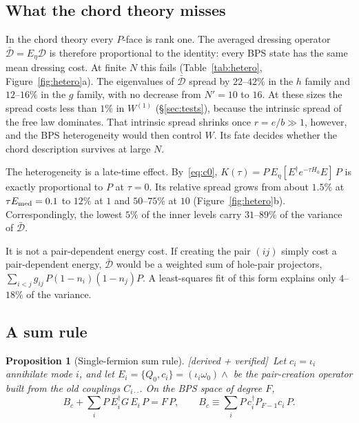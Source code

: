 \documentclass[11pt]{article}
\newcommand{\Np}{N'}
\newcommand{\Dc}{\mathcal D}
\newcommand{\Dbar}{\bar{\mathcal D}}
\newcommand{\Wone}{W^{(1)}}
\newcommand{\tagbox}[2]{\textsf{\small\color{#1}[#2]}}
\newcommand{\VER}{\tagbox{cder}{derived + verified}}
\theoremstyle{plain}
\newtheorem{proposition}{Proposition}
\theoremstyle{remark}
\numberwithin{equation}{section}
\begin{document}
\subsection{What the chord theory misses}

In the chord theory every $P$-face is rank one. The averaged dressing operator $\Dbar=E_\eta\Dc$ is therefore
proportional to the identity: every BPS state has the same mean dressing cost. At finite $N$ this fails
(Table~\ref{tab:hetero}, Figure~\ref{fig:hetero}a). The eigenvalues of $\Dbar$ spread by $22$--$42\%$ in the $h$ family
and $12$--$16\%$ in the $g$ family, with no decrease from $\Np=10$ to $16$. At these sizes the spread costs less than
$1\%$ in $\Wone$ (\S\ref{sec:tests}), because the intrinsic spread of the free law dominates. That intrinsic spread
shrinks once $r=e/b\gg1$, however, and the BPS heterogeneity would then control $W$. Its fate decides whether the chord
description survives at large $N$.

The heterogeneity is a late-time effect. By~\eqref{eq:c0}, $K(\tau)=P\,E_\eta[E^\dagger e^{-\tau H_0}E]\,P$ is exactly
proportional to $P$ at $\tau=0$. Its relative spread grows from about $1.5\%$ at $\tau E_{\rm med}=0.1$ to $12\%$ at $1$
and $50$--$75\%$ at $10$ (Figure~\ref{fig:hetero}b). Correspondingly, the lowest $5\%$ of the inner levels carry
$31$--$89\%$ of the variance of $\Dbar$.

It is not a pair-dependent energy cost. If creating the pair $(ij)$ simply cost a pair-dependent energy, $\Dbar$ would
be a weighted sum of hole-pair projectors, $\sum_{i<j}g_{ij}\,P(1-n_i)(1-n_j)P$. A least-squares fit of this form
explains only $4$--$18\%$ of the variance.

\subsection{A sum rule}

\begin{proposition}[Single-fermion sum rule]\label{prop:sumrule}\VER\
Let $c_i=\iota_i$ annihilate mode $i$, and let $E_i=\{Q_0,c_i\}=(\iota_i\omega_0)\wedge$ be the pair-creation
operator built from the old couplings $C_{i\cdot\cdot}$. On the BPS space of degree $F$,
\begin{equation}\label{eq:sumrule}
B_c+\sum_iP\,E_i^\dagger G\,E_i\,P=F\,P,\qquad B_c\equiv\sum_iP\,c_i^\dagger P_{F-1}c_i\,P .
\end{equation}
\end{proposition}
\end{document}
